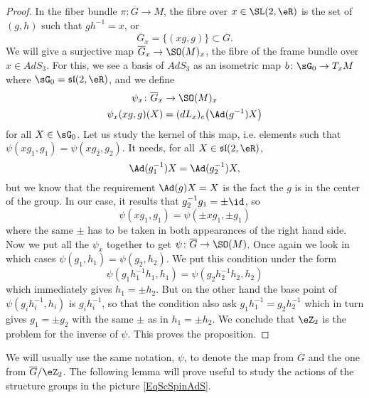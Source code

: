 \begin{proof}
	In the fiber bundle $\pi\colon \overline{G}\to M$, the fibre over $x\in\SL(2,\eR)$ is the set of $(g,h)$ such that $gh^{-1}=x$, or
	\[
		\overline{G}_{x}=\{ (xg,g) \}\subset \overline{G}.
	\]
	We will give a surjective map $\overline{G}_{x}\to\SO(M)_{x}$, the fibre of the frame bundle over $x\in AdS_3$. For this, we see a basis of $AdS_3$ as an isometric map $b\colon \sG_0\to T_{x}M$ where $\sG_{0}=\mathfrak{sl}(2,\eR)$, and we define
	\begin{equation}
		\begin{aligned}
			\psi_{x}\colon \overline{G}_{x} & \to \SO(M)_{x}                        \\
			\psi_{x}(xg,g)(X)               & =(dL_{x})_{e}\big( \Ad(g^{-1})X \big)
		\end{aligned}
	\end{equation}
	for all $X\in\sG_0$. Let us study the kernel of this map, i.e. elements such that $\psi(xg_1,g_1)=\psi(xg_2,g_2)$. It needs, for all $X\in\mathfrak{sl}(2,\eR)$,
	\[
		\Ad(g_1^{-1})X=\Ad(g_2^{-1})X,
	\]
	but we know that the requirement $\Ad(g)X=X$ is the fact the $g$ is in the center of the group. In our case, it results that $g_2^{-1}g_1=\pm\id$, so
	\[
		\psi(xg_1,g_1)=\psi(\pm xg_1,\pm g_1)
	\]
	where the same $\pm$ has to be taken in both appearances of the right hand side. Now we put all the $\psi_{x}$ together to get $\psi\colon \overline{G}\to \SO(M)$. Once again we look in which cases $\psi(g_1,h_1)=\psi(g_2,h_2)$. We put this condition under the form
	\[
		\psi(g_1h_1^{-1}h_1,h_1)=\psi(g_2h_2^{-1}h_2,h_2)
	\]
	which immediately gives $h_1=\pm h_2$. But on the other hand the base point of $\psi(g_{i}h_{i}^{-1},h_{i})$ is $g_{i}h_{i}^{-1}$, so that the condition also ask $g_1h_1^{-1}=g_2h_2^{-1}$ which in turn gives $g_1=\pm g_2$ with the same $\pm$ as in $h_1=\pm h_2$. We conclude that $\eZ_{2}$ is the problem for the inverse of $\psi$. This proves the proposition.
\end{proof}
We will usually use the same notation, $\psi$, to denote the map from $\overline{G}$ and the one from $\overline{G}/\eZ_{2}$. The following lemma will prove useful to study the actions of the structure groups in the picture \eqref{EqScSpinAdS}.

